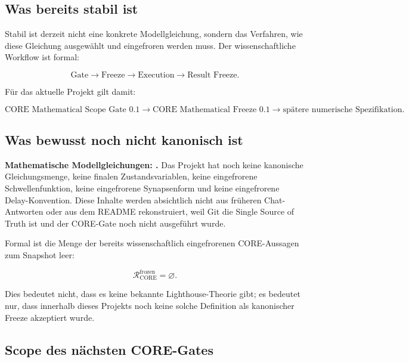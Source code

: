 \documentclass[11pt,a4paper]{article}
\newcommand{\status}[2]{\tcbox[on line,boxrule=0pt,arc=1.5pt,left=4pt,right=4pt,top=2pt,bottom=2pt,colback=#2!12,coltext=#2,fontupper=\bfseries\footnotesize]{#1}}
\newcommand{\OPEN}{\status{OPEN}{amber}}
\begin{document}
\subsection{Was bereits stabil ist}

Stabil ist derzeit nicht eine konkrete Modellgleichung, sondern das Verfahren, wie diese Gleichung ausgewählt und eingefroren werden muss. Der wissenschaftliche Workflow ist formal:

\[
\text{Gate} \longrightarrow \text{Freeze} \longrightarrow \text{Execution} \longrightarrow \text{Result Freeze}.
\]

Für das aktuelle Projekt gilt damit:

\[
\text{CORE Mathematical Scope Gate 0.1}
\longrightarrow
\text{CORE Mathematical Freeze 0.1}
\longrightarrow
\text{spätere numerische Spezifikation}.
\]

\subsection{Was bewusst noch nicht kanonisch ist}

\begin{warningbox}
\textbf{Mathematische Modellgleichungen: \OPEN.} Das Projekt hat noch keine kanonische Gleichungsmenge, keine finalen Zustandsvariablen, keine eingefrorene Schwellenfunktion, keine eingefrorene Synapsenform und keine eingefrorene Delay-Konvention. Diese Inhalte werden absichtlich nicht aus früheren Chat-Antworten oder aus dem README rekonstruiert, weil Git die Single Source of Truth ist und der CORE-Gate noch nicht ausgeführt wurde.
\end{warningbox}

Formal ist die Menge der bereits wissenschaftlich eingefrorenen CORE-Aussagen zum Snapshot leer:

\[
\mathcal{R}_{\mathrm{CORE}}^{\mathrm{frozen}} = \varnothing.
\]

Dies bedeutet nicht, dass es keine bekannte Lighthouse-Theorie gibt; es bedeutet nur, dass innerhalb dieses Projekts noch keine solche Definition als kanonischer Freeze akzeptiert wurde.

\subsection{Scope des nächsten CORE-Gates}
\end{document}
